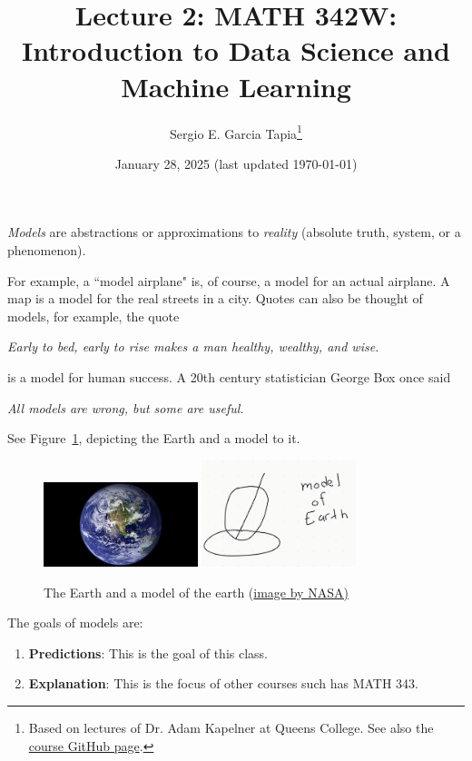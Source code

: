 \documentclass[12pt, a4paper]{article}
\title{Lecture 2: MATH 342W: Introduction to Data Science and Machine Learning}
\author{Sergio E. Garcia Tapia\thanks{Based on lectures of Dr. Adam Kapelner at Queens College.
See also the \href{https://github.com/kapelner/QC_MATH_342W_Spring_2025}{course GitHub page}.}}
\date{January 28, 2025 (last updated \today)}
\theoremstyle{definition}
\begin{document}
	\maketitle
	\textit{Models} are abstractions or approximations to \textit{reality} (absolute truth,
	system, or a phenomenon).
	
	For example, a ``model airplane" is, of course, a model for an actual airplane.
	A map is a model for the real streets in a city. Quotes can also be thought of models,
	for example, the quote
	\begin{displayquote}
		\textit{Early to bed, early to rise makes a man healthy, wealthy, and wise.}
	\end{displayquote}
	is a model for human success. A 20th century statistician George Box once said
	\begin{displayquote}
		\textit{All models are wrong, but some are useful.}
	\end{displayquote}
	See Figure~\ref{fig:earth-model}, depicting the Earth and a model to it.
	\begin{figure}
		\centering
		\includegraphics[width=0.4\textwidth]{earth}
		\hspace{2cm}
		\includegraphics[width=0.4\textwidth]{model-of-earth}
		\caption{The Earth and a model of the earth (\href{https://www.space.com/54-earth-history-composition-and-atmosphere.html}{image by NASA)}}
		\label{fig:earth-model}
	\end{figure}
	The goals of models are:
	\begin{enumerate}[label=(\arabic*)]
		\item \textbf{Predictions}: This is the goal of this class.
		\item \textbf{Explanation}: This is the focus of other courses such has MATH 343.
	\end{enumerate}
\end{document}
